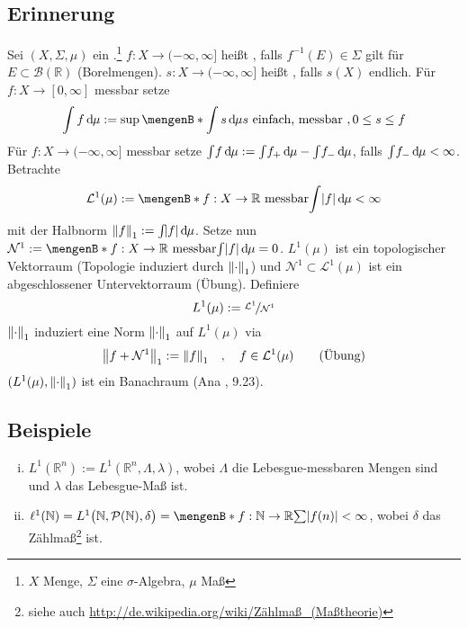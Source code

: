 \subsection[Erinnerung: $L^1(\mu)$ ist ein Banachraum]{Erinnerung} %
\label{sub:41}
Sei $(X,\Sigma, \mu)$ ein .\footnote{$X$ Menge, $\Sigma$ eine $\sigma$-Algebra, $\mu$ Maß}  $f : X \to (-\infty,\infty]$ heißt , falls 
$f ^{-1}(E) \in \Sigma$ gilt für $E \subset \mathcal{B}(\mathds{R})$ (Borelmengen). $s : X \to (-\infty,\infty]$ heißt , falls 
$s(X)$ endlich. Für $f : X \to [0,\infty]$ messbar setze
\[
	\int f  \, \mathd \mu := \sup \set[\int s \, \mathd \mu]{s \text{ einfach, messbar }, 0 \le s \le f} 
\] 
Für $f : X \to (-\infty,\infty]$ messbar setze $\int\! f \, \mathrm{d}\mkern-1.0mu \mu := \int \! f_+ \, \mathrm{d}\mkern-1.0mu \mu - \int \! f_- \, \mathrm{d}\mkern-1.0mu \mu$, falls $\int \! f_- \, \mathrm{d}\mkern-1.0mu \mu < \infty$.
Betrachte
\begin{align*}
	\mathcal{L}^1(\mu) := \set[f : X \to \mathds{R} \text{ messbar}]{\int \abs*{f}\,\mathd \mu < \infty } 
\end{align*}
mit der Halbnorm $\norm[1]{f} := \int \! \abs*{f} \, \mathd \mu $. Setze nun $\mathcal{N}^1 := \set[f : X \to \mathds{R} \text{ messbar}]{\int \abs*{f} \, \mathd \mu =0 }$.
$L^1(\mu)$ ist ein topologischer Vektorraum (Topologie induziert durch $\norm[1]{\cdot}$) und $\mathcal{N}^1 \subset \mathcal{L}^1(\mu)$ ist ein abgeschlossener 
Untervektorraum (Übung). Definiere 
\[
	L^1(\mu) := \nicefrac{\mathcal{L}^1}{\mathcal{N}^1}
\]
$\norm[1]{\cdot }$ induziert eine Norm $\norm[1]{\cdot }$ auf $L^1(\mu)$ via  
\[
	\norm[1]{f+ \mathcal{N}^1} := \norm[1]{f} \quad , \quad f \in \mathcal{L}^1(\mu) \tag*{(Übung)}
\]
$(L^1(\mu),\norm[1]{\cdot})$ ist ein Banachraum (Ana , 9.23).

\subsection[Beispiele für $L^1$-Räume]{Beispiele} %
\label{sub:42}
\begin{enumerate}[(i)]
	\item $L^1(\mathds{R}^n) := L^1(\mathds{R}^n, \Lambda, \lambda)$, wobei $\Lambda$ die Lebesgue-messbaren Mengen sind und $\lambda $ das Lebesgue-Maß ist.
	\item $\ell^1(\mathds{N})= L^1 \enbrace[\big]{\mathds{N}, \mathcal{P}(\mathds{N}), \delta} = \set[f : \mathds{N} \to \mathds{R}]{\sum \abs*{f(n)} < \infty } $, 
	wobei $\delta$ das Zählmaß\footnote{siehe auch \url{http://de.wikipedia.org/wiki/Zählmaß_(Maßtheorie)}} ist.
\end{enumerate}

